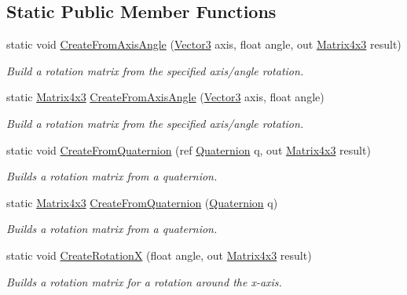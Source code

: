 \subsection*{Static Public Member Functions}
\begin{DoxyCompactItemize}
\item 
static void \hyperlink{struct_open_t_k_1_1_matrix4x3_a936c27da2c3ce56757d586a84b22a658}{Create\-From\-Axis\-Angle} (\hyperlink{struct_open_t_k_1_1_vector3}{Vector3} axis, float angle, out \hyperlink{struct_open_t_k_1_1_matrix4x3}{Matrix4x3} result)
\begin{DoxyCompactList}\small\item\em Build a rotation matrix from the specified axis/angle rotation. \end{DoxyCompactList}\item 
static \hyperlink{struct_open_t_k_1_1_matrix4x3}{Matrix4x3} \hyperlink{struct_open_t_k_1_1_matrix4x3_ad6bc90b923b7be4d0dd51109f20c7c87}{Create\-From\-Axis\-Angle} (\hyperlink{struct_open_t_k_1_1_vector3}{Vector3} axis, float angle)
\begin{DoxyCompactList}\small\item\em Build a rotation matrix from the specified axis/angle rotation. \end{DoxyCompactList}\item 
static void \hyperlink{struct_open_t_k_1_1_matrix4x3_a1adc5002745e6ce5dbc7b6799506e773}{Create\-From\-Quaternion} (ref \hyperlink{struct_open_t_k_1_1_quaternion}{Quaternion} q, out \hyperlink{struct_open_t_k_1_1_matrix4x3}{Matrix4x3} result)
\begin{DoxyCompactList}\small\item\em Builds a rotation matrix from a quaternion. \end{DoxyCompactList}\item 
static \hyperlink{struct_open_t_k_1_1_matrix4x3}{Matrix4x3} \hyperlink{struct_open_t_k_1_1_matrix4x3_a040eacc2b3f4375e7577c24a512b40fa}{Create\-From\-Quaternion} (\hyperlink{struct_open_t_k_1_1_quaternion}{Quaternion} q)
\begin{DoxyCompactList}\small\item\em Builds a rotation matrix from a quaternion. \end{DoxyCompactList}\item 
static void \hyperlink{struct_open_t_k_1_1_matrix4x3_a81df0db9141918077b4454918cf4034f}{Create\-Rotation\-X} (float angle, out \hyperlink{struct_open_t_k_1_1_matrix4x3}{Matrix4x3} result)
\begin{DoxyCompactList}\small\item\em Builds a rotation matrix for a rotation around the x-\/axis. \end{DoxyCompactList}\item 

\end{DoxyCompactItemize}
